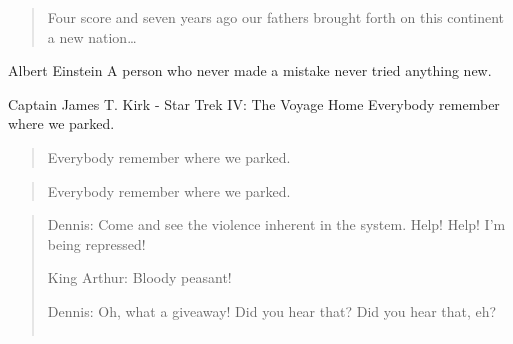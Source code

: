 \begin{quote}
Four score and seven years ago our fathers brought forth
on this continent a new nation…​\end{quote}

\begin{aquote}{Albert Einstein}
A person who never made a mistake never tried anything new.\end{aquote}

\begin{aquote}{Captain James T. Kirk - Star Trek IV: The Voyage Home}
Everybody remember where we parked.\end{aquote}

\begin{quote}
Everybody remember where we parked.\end{quote}

\begin{quote}
Everybody remember where we parked.\end{quote}

\begin{quote}
Dennis: Come and see the violence inherent in the system. Help! Help! I’m being repressed!


King Arthur: Bloody peasant!


Dennis: Oh, what a giveaway! Did you hear that? Did you hear that, eh?


\begin{verbatim}

\end{verbatim}
\end{quote}

